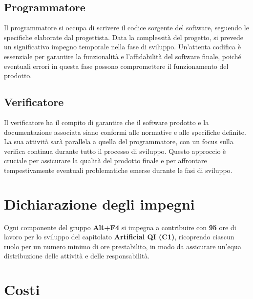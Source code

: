 \documentclass[a4paper, 12pt]{article}
\begin{document}
\subsection{Programmatore}
Il programmatore si occupa di scrivere il codice sorgente del software, seguendo le specifiche elaborate dal progettista. Data la complessità del progetto, si prevede un significativo impegno temporale nella fase di sviluppo. 
Un'attenta codifica è essenziale per garantire la funzionalità e l'affidabilità del software finale, poiché eventuali errori in questa fase possono compromettere il funzionamento del prodotto.
\subsection{Verificatore}
Il verificatore ha il compito di garantire che il software prodotto e la documentazione associata siano conformi alle normative e alle specifiche definite. 
La sua attività sarà parallela a quella del programmatore, con un focus sulla verifica continua durante tutto il processo di sviluppo. 
Questo approccio è cruciale per assicurare la qualità del prodotto finale e per affrontare tempestivamente eventuali problematiche emerse durante le fasi di sviluppo.

\newpage
\section {Dichiarazione degli impegni}
Ogni componente del gruppo \textbf{Alt+F4} si impegna a contribuire con \textbf{95} ore di lavoro per lo sviluppo del capitolato
\textbf{ Artificial QI (C1)}, ricoprendo ciascun ruolo per un numero minimo di ore prestabilito, in modo da assicurare un’equa distribuzione delle attività e delle responsabilità.
\section{Costi}
\end{document}
